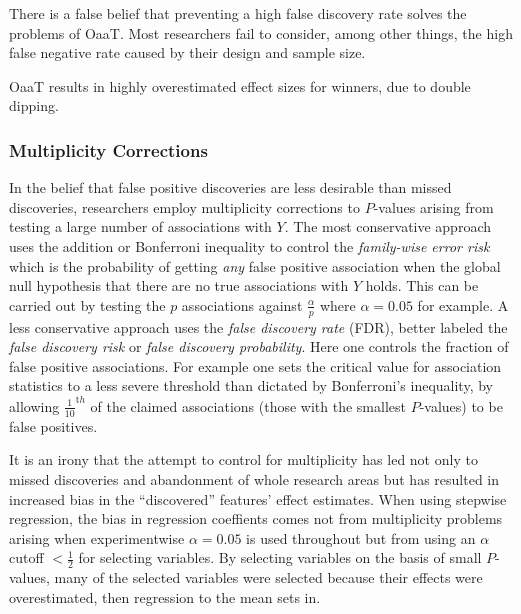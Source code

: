 There is a false belief that preventing a high false discovery rate solves the problems of OaaT.  Most researchers fail to consider, among other things, the high false negative rate caused by their design and sample size.

OaaT results in highly overestimated effect sizes for winners, due to
double dipping.

\subsubsection{Multiplicity Corrections}
In the belief that false positive discoveries are less desirable than
missed discoveries, researchers employ multiplicity corrections to
$P$-values arising from testing a large number of associations with
$Y$.  The most conservative approach uses the addition or Bonferroni
inequality to control the \emph{family-wise error risk} which is the
probability of getting \emph{any} false positive association when the global
null hypothesis that there are no true associations with $Y$ holds.
This can be carried out by testing the $p$ associations against
$\frac{\alpha}{p}$ where $\alpha=0.05$ for example.  A less
conservative approach uses the \emph{false discovery rate} (FDR),
better labeled the \emph{false discovery risk} or \emph{false
  discovery probability}.  Here one controls the fraction of false
positive associations.  For example one sets the critical value for
association statistics to a less severe threshold than dictated by
Bonferroni's inequality, by allowing $\frac{1}{10}^{\mathrm th}$ of
the claimed associations (those with the smallest $P$-values) to be
false positives.

It is an irony that the attempt to control for multiplicity has led
not only to missed discoveries and abandonment of whole research areas
but has resulted in increased bias in the ``discovered'' features'
effect estimates.  When using stepwise regression, the bias in
regression coeffients comes not from multiplicity problems arising
when experimentwise $\alpha=0.05$ is used throughout but from using an
$\alpha$ cutoff $< \frac{1}{2}$ for selecting variables.  By selecting
variables on the basis of small $P$-values, many of the selected
variables were selected because their effects were overestimated, then
regression to the mean sets in.


